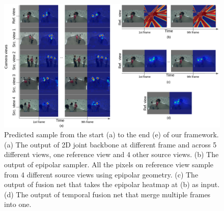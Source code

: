 \begin{figure}
	\centering
	\includegraphics[width=1.0\columnwidth]{figures/ch4/full-framework-heatmap.png}
	\caption{Predicted sample from the start (a) to the end (e) of our framework. (a) The output of 2D joint backbone at different frame and across 5 different views, one reference view and 4 other source views. (b) The output of epipolar sampler. All the pixels on reference view sample from 4 different source views using epipolar geometry. (c) The output of fusion net that takes the epipolar heatmap at (b) as input. (d) The output of temporal fusion net that merge multiple frames into one.}
	\label{fig:full-framework-heatmap}
\end{figure}

